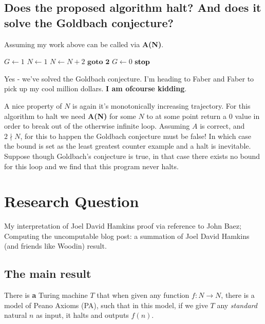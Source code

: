 \documentclass{article}
\begin{document}
\subsection{Does the proposed algorithm halt? And does it solve the Goldbach conjecture?}
Assuming my work above can be called via \textbf{A(N)}.

\begin{algorithmic}[1]
	\STATE $G \leftarrow 1$
	\STATE $N \leftarrow 1$
			\STATE $N \leftarrow N + 2$
			\STATE $\textbf{goto 2}$
		\ENDIF
		\STATE $G \leftarrow 0$
	\STATE $\text{\textbf{stop}}$ 
\end{algorithmic}

Yes - we've solved the Goldbach conjecture. I'm heading to Faber and Faber to pick up my cool million dollars. \textbf{I am ofcourse kidding}. 

A nice property of $N$ is again it's monotonically increasing trajectory. For this algorithm to halt we need \textbf{A(N)} for some $N$ to at some point return a $0$ value in order to break out of the otherwise infinite loop. Assuming $A$ is correct, and $2 \nmid N$, for this to happen the Goldbach conjecture must be false! In which case the bound is set as the least greatest counter example and a halt is inevitable. Suppose though Goldbach's conjecture is true, in that case there exists no bound for this loop and we find that this program never halts.

\pagebreak
\section{Research Question}
My interpretation of Joel David Hamkins proof via reference to John Baez; Computing the uncomputable blog post: a summation of Joel David Hamkins (and friends like Woodin) result.

\subsection{The main result}
There is \textbf{a} Turing machine $T$ that when given any function $f: N \rightarrow N$, there is a model of Peano Axioms (PA), such that in this model, if we give $T$ any \emph{standard} natural $n$ as input, it halts and outputs $f(n)$.
\end{document}
